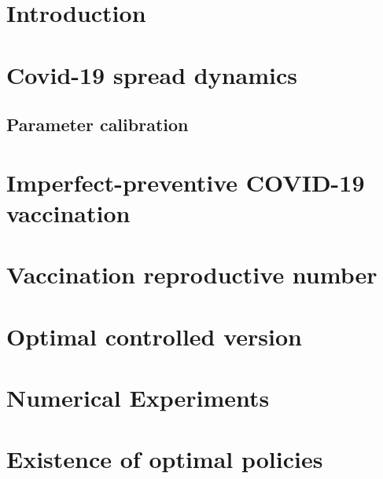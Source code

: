 \documentclass[sort&compress, review]{elsarticle}
\begin{document}
     \section{Introduction}
        
    \section{Covid-19 spread dynamics}
        
        \subsection{Parameter calibration}
            
    \section{Imperfect-preventive COVID-19 vaccination}
        
    \section{Vaccination reproductive number}
        
    \section{Optimal controlled version}
        
    \section{Numerical Experiments}
        
        

    \listofchanges[style=compactsummary]
    \appendix
  \section{Existence of optimal policies}
    
  
  
  
\end{document}
